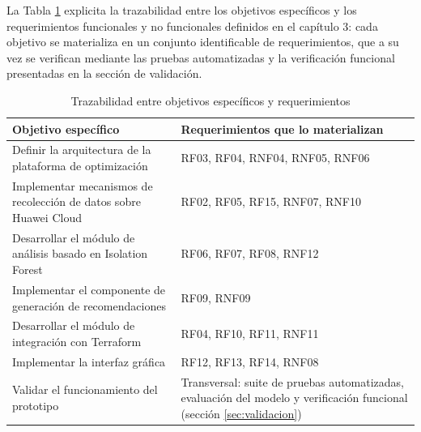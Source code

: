 La Tabla \ref{tab:objetivos-requerimientos} explicita la trazabilidad entre los objetivos específicos y los requerimientos funcionales y no funcionales definidos en el capítulo 3: cada objetivo se materializa en un conjunto identificable de requerimientos, que a su vez se verifican mediante las pruebas automatizadas y la verificación funcional presentadas en la sección de validación.

\begin{table}[H]
\centering
\scriptsize
\setlength{\tabcolsep}{4pt}
\renewcommand{\arraystretch}{1.2}
\begin{tabular}{|p{6.2cm}|p{7.2cm}|}
\hline
\textbf{Objetivo específico} & \textbf{Requerimientos que lo materializan} \\
\hline
Definir la arquitectura de la plataforma de optimización & RF03, RF04, RNF04, RNF05, RNF06 \\
\hline
Implementar mecanismos de recolección de datos sobre Huawei Cloud & RF02, RF05, RF15, RNF07, RNF10 \\
\hline
Desarrollar el módulo de análisis basado en Isolation Forest & RF06, RF07, RF08, RNF12 \\
\hline
Implementar el componente de generación de recomendaciones & RF09, RNF09 \\
\hline
Desarrollar el módulo de integración con Terraform & RF04, RF10, RF11, RNF11 \\
\hline
Implementar la interfaz gráfica & RF12, RF13, RF14, RNF08 \\
\hline
Validar el funcionamiento del prototipo & Transversal: suite de pruebas automatizadas, evaluación del modelo y verificación funcional (sección \ref{sec:validacion}) \\
\hline
\end{tabular}
\caption{Trazabilidad entre objetivos específicos y requerimientos}
\label{tab:objetivos-requerimientos}
\end{table}
